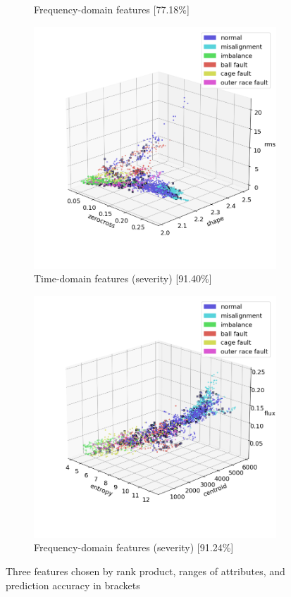 \begin{figure}[h]
\begin{subfigure}[b]{0.48\textwidth}
        \caption{Frequency-domain features [77.18\%]}
    \end{subfigure}
    \hfill
    \begin{subfigure}[b]{0.48\textwidth}
        \includegraphics[width=\textwidth]{assets/results/labels/TD-severity.png}
        \caption{Time-domain features (severity) [91.40\%]}
    \end{subfigure}
    \hfill
    \begin{subfigure}[b]{0.48\textwidth}
        \includegraphics[width=\textwidth]{assets/results/labels/FD-severity.png}
        \caption{Frequency-domain features (severity) [91.24\%]}
    \end{subfigure} 
    \caption{Three features chosen by rank product, ranges of attributes, and prediction accuracy in brackets}
\end{figure}

